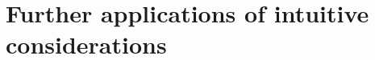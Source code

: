 \paragraph{} %

\paragraph{} %

\paragraph{} %

\paragraph{} %

\paragraph{} %

\paragraph{} %

\paragraph{} %

\paragraph{} %

\paragraph{} %

\section{Further applications of intuitive considerations}

\paragraph{} %

\paragraph{} %

